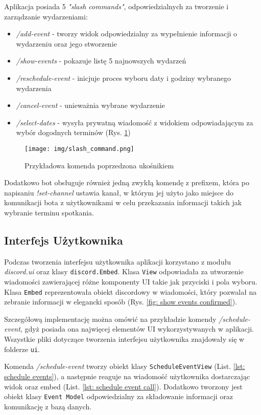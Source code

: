 \documentclass[11pt,a4paper]{article}
\newcommand{\classname}[1]{\texttt{#1}}
\begin{document}
Aplikacja posiada 5 \textit{"slash commands"}, odpowiedzialnych za tworzenie i zarządzanie wydarzeniami:
\begin{itemize}
    \item \textit{/add-event} - tworzy widok odpowiedzialny za wypełnienie informacji o wydarzeniu oraz jego stworzenie
    \item \textit{/show-events} - pokazuje listę 5 najnowszych wydarzeń
    \item \textit{/reschedule-event} - inicjuje proces wyboru daty i godziny wybranego wydarzenia
    \item \textit{/cancel-event} - unieważnia wybrane wydarzenie
    \item \textit{/select-dates} - wysyła prywatną wiadomość z widokiem odpowiadającym za wybór dogodnych terminów (Rys. \ref{img: slash_command})
\end{itemize}

\begin{figure}[H]
    \centering
    \texttt{[image: img/slash\_command.png]}
    \caption{Przykładowa komenda poprzedzona ukośnikiem}
    \label{img: slash_command}
\end{figure}

Dodatkowo bot obsługuje również jedną zwykłą komendę z prefixem, która po napisaniu \textit{!set-channel}
ustawia kanał, w którym jej użyto jako miejsce do komunikacji bota z użytkownikami w celu przekazania informacji takich jak wybranie terminu spotkania.

\subsection{Interfejs Użytkownika}

Podczas tworzenia interfejsu użytkownika aplikacji korzystano z modułu \textit{discord.ui} \cite{BotUIKit} oraz klasy \classname{discord.Embed}. Klasa \classname{View} odpowiadała za utworzenie wiadomości zawierającej różne komponenty UI takie jak przyciski i pola wyboru. Klasa \classname{Embed} reprezentowała obiekt discordowy w wiadomości, który pozwalał na zebranie informacji w elegancki sposób (Rys. \ref{fig: show events confirmed}).

Szczegółową implementację można omówić na przykładzie komendy \textit{/schedule-event}, gdyż posiada ona najwięcej elementów UI wykorzystywanych w aplikacji. Wszystkie pliki dotyczące tworzenia interfejsu użytkownika znajdowały się w folderze \texttt{ui}.

Komenda \textit{/schedule-event} tworzy obiekt klasy \classname{ScheduleEventView} (List. \ref{lst: schedule events}), a następnie reaguje na wiadomość użytkownika dostarczając widok oraz embed (List. \ref{lst: schedule event call}). Dodatkowo tworzony jest obiekt klasy \classname{Event Model} odpowiedzialny za składowanie informacji oraz komunikację z bazą danych.
\end{document}

